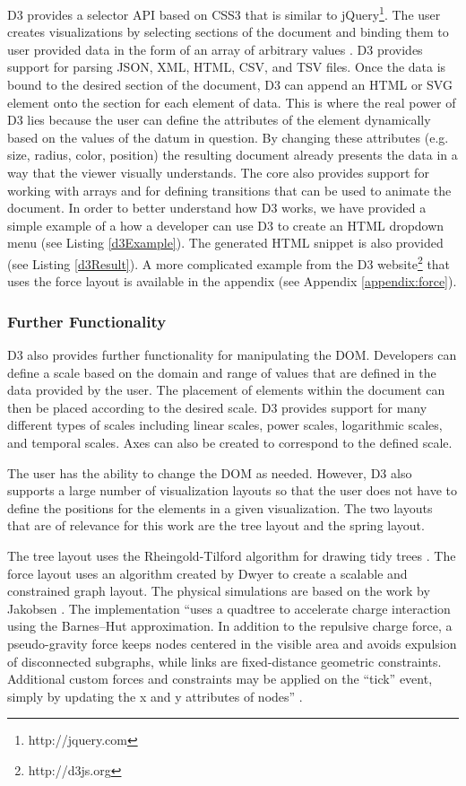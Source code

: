 D3 provides a selector API based on CSS3 that is similar to jQuery\footnote{http://jquery.com}. The user creates visualizations by selecting sections of the document and binding them to user provided data in the form of an array of arbitrary values \cite{2011-d3}. D3 provides support for parsing JSON, XML, HTML, CSV, and TSV files. Once the data is bound to the desired section of the document, D3 can append an HTML or SVG element onto the section for each element of data. This is where the real power of D3 lies because the user can define the attributes of the element dynamically based on the values of the datum in question. By changing these attributes (e.g. size, radius, color, position) the resulting document already presents the data in a way that the viewer visually understands. The core also provides support for working with arrays and for defining transitions that can be used to animate the document. In order to better understand how D3 works, we have provided a simple example of a how a developer can use D3 to create an HTML dropdown menu (see Listing \ref{d3Example}). The generated HTML snippet is also provided (see Listing \ref{d3Result}). A more complicated example from the D3 website\footnote{http://d3js.org} that uses the force layout is available in the appendix (see Appendix \ref{appendix:force}).

\subsubsection{Further Functionality}

D3 also provides further functionality for manipulating the DOM. Developers can define a scale based on the domain and range of values that are defined in the data provided by the user. The placement of elements within the document can then be placed according to the desired scale. D3 provides support for many different types of scales including linear scales, power scales, logarithmic scales, and temporal scales. Axes can also be created to correspond to the defined scale.

The user has the ability to change the DOM as needed. However, D3 also supports a large number of visualization layouts so that the user does not have to define the positions for the elements in a given visualization. The two layouts that are of relevance for this work are the tree layout and the spring layout.

The tree layout uses the Rheingold-Tilford algorithm for drawing tidy trees \cite{Reingold81}. The force layout uses an algorithm created by Dwyer \cite{Dwyer2009} to create a scalable and constrained graph layout. The physical simulations are based on the work by Jakobsen \cite{Jakobsen03}. The implementation ``uses a quadtree to accelerate charge interaction using the Barnes–Hut approximation. In addition to the repulsive charge force, a pseudo-gravity force keeps nodes centered in the visible area and avoids expulsion of disconnected subgraphs, while links are fixed-distance geometric constraints. Additional custom forces and constraints may be applied on the ``tick'' event, simply by updating the x and y attributes of nodes'' \cite{D3Wiki}.

